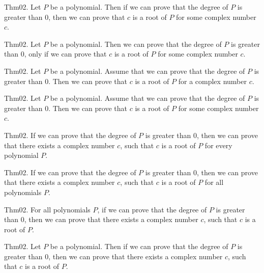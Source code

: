\documentclass{article}
\begin{document}
Thm02. Let $P$ be a polynomial. Then if we can prove that the degree of $P$ is greater than $0$, then we can prove that $c$ is a root of $P$ for some complex number $c$.

Thm02. Let $P$ be a polynomial. Then we can prove that the degree of $P$ is greater than $0$, only if we can prove that $c$ is a root of $P$ for some complex number $c$.

Thm02. Let $P$ be a polynomial. Assume that we can prove that the degree of $P$ is greater than $0$. Then we can prove that $c$ is a root of $P$ for a complex number $c$.

Thm02. Let $P$ be a polynomial. Assume that we can prove that the degree of $P$ is greater than $0$. Then we can prove that $c$ is a root of $P$ for some complex number $c$.

Thm02. If we can prove that the degree of $P$ is greater than $0$, then we can prove that there exists a complex number $c$, such that $c$ is a root of $P$ for every polynomial $P$.

Thm02. If we can prove that the degree of $P$ is greater than $0$, then we can prove that there exists a complex number $c$, such that $c$ is a root of $P$ for all polynomials $P$.

Thm02. For all polynomials $P$, if we can prove that the degree of $P$ is greater than $0$, then we can prove that there exists a complex number $c$, such that $c$ is a root of $P$.

Thm02. Let $P$ be a polynomial. Then if we can prove that the degree of $P$ is greater than $0$, then we can prove that there exists a complex number $c$, such that $c$ is a root of $P$.
\end{document}
